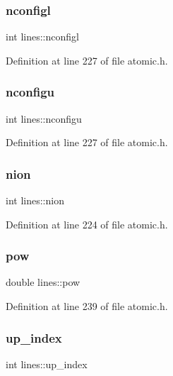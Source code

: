 \subsubsection{\texorpdfstring{nconfigl}{nconfigl}}
{\footnotesize\ttfamily int lines\+::nconfigl}



Definition at line 227 of file atomic.\+h.

\mbox{\label{structlines_a96fff3bddbfd451e708fe60b9b495784}} 
\subsubsection{\texorpdfstring{nconfigu}{nconfigu}}
{\footnotesize\ttfamily int lines\+::nconfigu}



Definition at line 227 of file atomic.\+h.

\mbox{\label{structlines_a041ae338e41bad14998557cbd42443fc}} 
\subsubsection{\texorpdfstring{nion}{nion}}
{\footnotesize\ttfamily int lines\+::nion}



Definition at line 224 of file atomic.\+h.

\mbox{\label{structlines_a3a0d7a9e793ec94dea8247160927062d}} 
\subsubsection{\texorpdfstring{pow}{pow}}
{\footnotesize\ttfamily double lines\+::pow}



Definition at line 239 of file atomic.\+h.

\mbox{\label{structlines_aba84d0d3fbc46d274bba8235e5758806}} 
\subsubsection{\texorpdfstring{up\+\_\+index}{up\_index}}
{\footnotesize\ttfamily int lines\+::up\+\_\+index}



